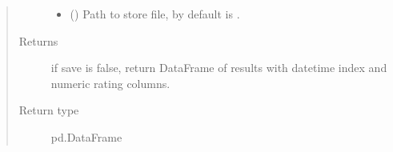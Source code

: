 \documentclass[letterpaper,10pt,english]{report}
\begin{document}
\begin{fulllineitems}
\begin{fulllineitems}
\begin{quote}
\begin{description}
\begin{itemize}
\item {} 
 (\sphinxstyleliteralemphasis{\sphinxupquote{, }}) \textendash{} Path to store file, by default is .

\end{itemize}

\item[{Returns}] \leavevmode
{} \textendash{} if save is false, return DataFrame of results
with datetime index and numeric rating columns.

\item[{Return type}] \leavevmode
pd.DataFrame

\end{description}\end{quote}

\end{fulllineitems}


\end{fulllineitems}

\end{document}
